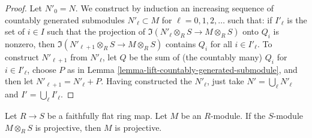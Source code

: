 \begin{proof}
Let $N'_0 = N$.  We construct by induction an increasing sequence of countably
generated submodules $N'_{\ell} \subset M$ for $\ell = 0, 1, 2, \ldots$
such that: if $I'_{\ell}$ is the set of $i \in I$ such that the projection of
$\Im(N'_{\ell} \otimes_R S \to M \otimes_R S)$ onto $Q_i$ is
nonzero, then $\Im(N'_{\ell + 1} \otimes_R S \to M \otimes_R
S)$ contains $Q_i$ for all $i \in I'_{\ell}$.  To construct $N'_{\ell + 1}$
from $N'_\ell$, let $Q$ be the sum of (the countably many) $Q_i$ for
$i \in I'_{\ell}$, choose $P$ as in Lemma
\ref{lemma-lift-countably-generated-submodule}, and then let $N'_{\ell + 1} =
N'_{\ell} + P$.  Having constructed the $N'_{\ell}$, just take $N' =
\bigcup_{\ell} N'_{\ell}$ and $I' = \bigcup_{\ell} I'_{\ell}$.
\end{proof}

\begin{theorem}
\label{theorem-ffdescent-projectivity}
Let $R \to S$ be a faithfully flat ring map.  Let $M$ be an $R$-module.
 If the $S$-module $M \otimes_R S$ is projective, then $M$ is projective.
\end{theorem}


